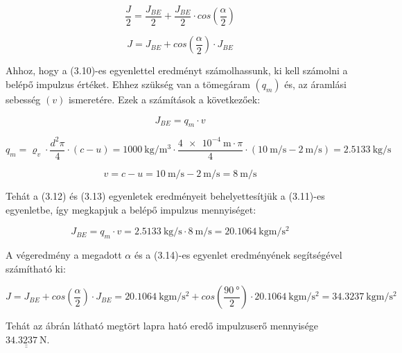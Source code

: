 \begin{equation}
\frac{J}{2}=\frac{J_{BE}}{2}+\frac{J_{BE}}{2}\cdot{cos\left(\frac{\alpha}{2}\right)}
\end{equation}

\begin{equation}
J=J_{BE}+{cos\left(\frac{\alpha}{2}\right)}\cdot{J_{BE}}
\end{equation}

\noindent Ahhoz, hogy a (3.10)-es egyenlettel eredményt számolhassunk, ki kell számolni a belépő impulzus értéket. Ehhez szükség van a tömegáram $(q_m)$ és, az áramlási sebesség $(v)$ ismeretére. Ezek a számítások a következőek:

\begin{equation}
J_{BE}=q_m\cdot{v}
\end{equation}

\begin{equation}
q_m=\varrho_v\cdot{\frac{d^2{\pi}}{4}}\cdot(c-u)=\SI{1000}{\kilo\gram\per\meter\cubed}\cdot{\frac{{\SI{4e-4}{\meter}\cdot{\pi}}}{4}}\cdot(\SI{10}{\meter\per\second}-\SI{2}{\meter\per\second})=\SI{2,5133}{\kilo\gram\per\second}
\end{equation}

\begin{equation}
v=c-u=\SI{10}{\meter\per\second}-\SI{2}{\meter\per\second}=\SI{8}{\meter\per\second}
\end{equation}

\noindent Tehát a (3.12) és (3.13) egyenletek eredményeit behelyettesítjük a (3.11)-es egyenletbe, így megkapjuk a belépő impulzus mennyiséget:

\begin{equation}
J_{BE}=q_m\cdot{v}=\SI{2,5133}{\kilo\gram\per\second}\cdot{\SI{8}{\meter\per\second}}=\SI{20,1064}{\kilo\gram\meter\per\second\squared}
\end{equation}

\noindent A végeredmény a megadott $\alpha$ és a (3.14)-es egyenlet eredményének segítségével számítható ki:

\begin{equation}
J=J_{BE}+{cos\left(\frac{\alpha}{2}\right)}\cdot{J_{BE}}=\SI{20,1064}{\kilo\gram\meter\per\second\squared}+{cos\left(\frac{\SI{90}{\degree}}{2}\right)}\cdot{\SI{20,1064}{\kilo\gram\meter\per\second\squared}=\SI{34,3237}{\kilo\gram\meter\per\second\squared}}
\end{equation}


\noindent\centering Tehát az ábrán látható megtört lapra ható eredő impulzuserő mennyisége $\underline{\underline{\SI{34,3237}{\newton}}}$.

\pagebreak
